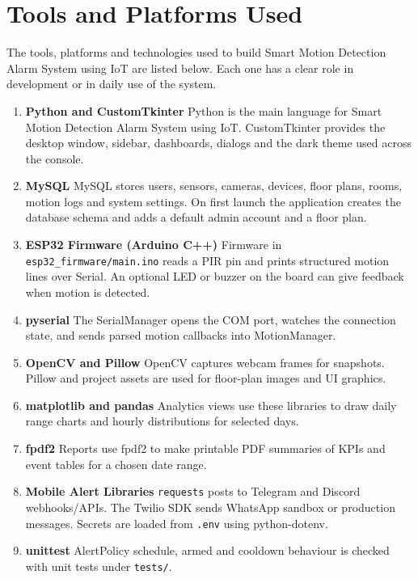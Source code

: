\documentclass[12pt,a4paper]{report}
\begin{document}
\section{Tools and Platforms Used}

The tools, platforms and technologies used to build Smart Motion Detection Alarm System using IoT are listed below. Each one has a clear role in development or in daily use of the system.

\begin{enumerate}

\item \textbf{Python and CustomTkinter}
Python is the main language for Smart Motion Detection Alarm System using IoT. CustomTkinter provides the desktop window, sidebar, dashboards, dialogs and the dark theme used across the console.

\item \textbf{MySQL}
MySQL stores users, sensors, cameras, devices, floor plans, rooms, motion logs and system settings. On first launch the application creates the database schema and adds a default admin account and a floor plan.

\item \textbf{ESP32 Firmware (Arduino C++)}
Firmware in \texttt{esp32\_firmware/main.ino} reads a PIR pin and prints structured motion lines over Serial. An optional LED or buzzer on the board can give feedback when motion is detected.

\item \textbf{pyserial}
The SerialManager opens the COM port, watches the connection state, and sends parsed motion callbacks into MotionManager.

\item \textbf{OpenCV and Pillow}
OpenCV captures webcam frames for snapshots. Pillow and project assets are used for floor-plan images and UI graphics.

\item \textbf{matplotlib and pandas}
Analytics views use these libraries to draw daily range charts and hourly distributions for selected days.

\item \textbf{fpdf2}
Reports use fpdf2 to make printable PDF summaries of KPIs and event tables for a chosen date range.

\item \textbf{Mobile Alert Libraries}
\texttt{requests} posts to Telegram and Discord webhooks/APIs. The Twilio SDK sends WhatsApp sandbox or production messages. Secrets are loaded from \texttt{.env} using python-dotenv.

\item \textbf{unittest}
AlertPolicy schedule, armed and cooldown behaviour is checked with unit tests under \texttt{tests/}.

\end{enumerate}
\end{document}
